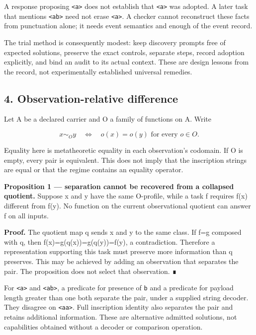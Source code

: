\documentclass[
  11pt,
]{article}
\begin{document}
A response proposing \texttt{\textless{}a\textgreater{}} does not
establish that \texttt{\textless{}a\textgreater{}} was adopted. A later
task that mentions \texttt{\textless{}ab\textgreater{}} need not erase
\texttt{\textless{}a\textgreater{}}. A checker cannot reconstruct these
facts from punctuation alone; it needs event semantics and enough of the
event record.

The trial method is consequently modest: keep discovery prompts free of
expected solutions, preserve the exact controls, separate steps, record
adoption explicitly, and bind an audit to its actual context. These are
design lessons from the record, not experimentally established universal
remedies.

\subsection{4. Observation-relative
difference}\label{observation-relative-difference}

Let A be a declared carrier and O a family of functions on A. Write

\[
x\sim_O y \quad\Longleftrightarrow\quad
   o(x)=o(y)\text{ for every }o\in O.
\]

Equality here is metatheoretic equality in each observation's codomain.
If O is empty, every pair is equivalent. This does not imply that the
inscription strings are equal or that the regime contains an equality
operator.

\textbf{Proposition 1 --- separation cannot be recovered from a
collapsed quotient.} Suppose x and y have the same O-profile, while a
task f requires f(x) different from f(y). No function on the current
observational quotient can answer f on all inputs.

\textbf{Proof.} The quotient map q sends x and y to the same class. If
f=g composed with q, then f(x)=g(q(x))=g(q(y))=f(y), a contradiction.
Therefore a representation supporting this task must preserve more
information than q preserves. This may be achieved by adding an
observation that separates the pair. The proposition does not select
that observation. ∎

For \texttt{\textless{}a\textgreater{}} and
\texttt{\textless{}ab\textgreater{}}, a predicate for presence of
\nolinkurl{b} and a predicate for payload length greater than one both
separate the pair, under a supplied string decoder. They disagree on
\texttt{\textless{}aa\textgreater{}}. Full inscription identity also
separates the pair and retains additional information. These are
alternative admitted solutions, not capabilities obtained without a
decoder or comparison operation.
\end{document}

